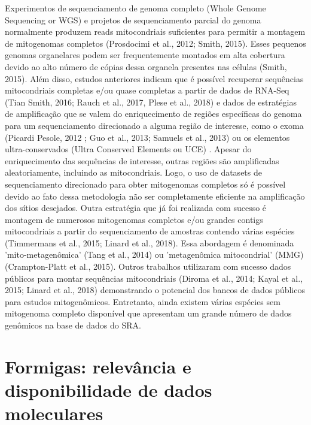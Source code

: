 \documentclass[../DISSERTACAO_MAIN.tex]{subfiles}
\begin{document}
Experimentos de sequenciamento de genoma completo (Whole Genome Sequencing or WGS) e projetos de sequenciamento parcial do genoma normalmente produzem reads mitocondriais suficientes  para permitir a montagem de mitogenomas completos (Prosdocimi et al., 2012; Smith, 2015). Esses pequenos genomas organelares podem ser frequentemente montados em alta cobertura devido ao alto número de cópias dessa organela presentes nas células (Smith, 2015). Além disso, estudos anteriores indicam que é possível recuperar sequências mitocondriais completas e/ou quase completas a partir de dados de RNA-Seq (Tian  Smith, 2016; Rauch et al., 2017, Plese et al., 2018) e dados de estratégias de amplificação que se valem do enriquecimento de regiões específicas do genoma para um sequenciamento direcionado a alguma região de interesse, como o exoma (Picardi  Pesole, 2012 ; Guo et al., 2013; Samuels et al., 2013) ou os elementos ultra-conservados (Ultra Conserved Elements ou UCE) \cite{DoAmaral2015, Miller2016}. Apesar do enriquecimento das sequências de interesse, outras regiões são amplificadas aleatoriamente, incluindo as mitocondriais. Logo, o uso de datasets de sequenciamento direcionado para obter mitogenomas completos só é possível  devido  ao fato dessa metodologia não ser completamente eficiente na amplificação dos sítios desejados. Outra estratégia que já foi realizada com sucesso é montagem de numerosos mitogenomas completos e/ou grandes contigs mitocondriais a partir do sequenciamento de amostras contendo várias espécies (Timmermans et al., 2015; Linard et al., 2018). Essa abordagem é denominada 'mito-metagenômica' (Tang et al., 2014) ou 'metagenômica mitocondrial' (MMG) (Crampton-Platt et al., 2015). Outros trabalhos utilizaram com sucesso dados públicos para montar sequências mitocondriais (Diroma et al., 2014; Kayal et al., 2015; Linard et al., 2018) demonstrando o potencial dos bancos de dados públicos para estudos mitogenômicos. Entretanto, ainda existem várias espécies sem mitogenoma completo disponível que apresentam um grande número de dados genômicos na base de dados do SRA.

\section{Formigas: relevância e disponibilidade de dados moleculares}
\end{document}
